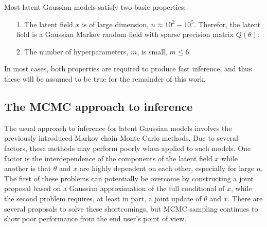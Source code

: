 \documentclass[12pt]{book}
\begin{document}
Most latent Gaussian models satisfy two basic properties:
\begin{itemize}
    \item[1.] The latent field $x$ is of large dimension, $n\approx10^2-10^5$. Therefor, the latent field is a Gaussian Markov random field with sparse precision matrix $Q\left(\theta\right)$.
    \item[2.] The number of hyperparameters, $m$, is small, $m\leq6$.
\end{itemize}
In most cases, both properties are required to produce fast inference, and thus these will be assumed to be true for the remainder of this work. \autocite[Cf.][]{rue2009approximate}
\subsection{The MCMC approach to inference}
The usual approach to inference for latent Gaussian models involves the previously introduced Markov chain Monte Carlo methods. Due to several factors, these methods may perform poorly when applied to such models. One factor is the interdependence of the components of the latent field $x$ while another is that $\theta$ and $x$ are highly dependent on each other, especially for large $n$. The first of these problems can potentially be overcome by constructing a joint proposal based on a Gaussian approximation of the full conditional of $x$, while the second problem requires, at least in part, a joint update of $\theta$ and $x$. There are several proposals to solve these shortcomings, but MCMC sampling continues to show poor performance from the end user's point of view. \autocite[Cf.][]{rue2009approximate}
\end{document}

